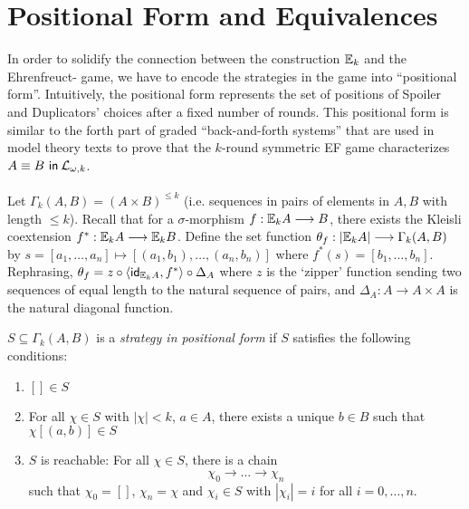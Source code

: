 \section{Positional Form and Equivalences}\label{sec:positionalFormEF}
In order to solidify the connection between the construction ${\mathbb{E}_{k}}$ and the Ehrenfreuct-{\Fraisse} game, we have to encode the strategies in the game into ``positional form''. Intuitively, the positional form represents the set of positions of Spoiler and Duplicators' choices after a fixed number of rounds. This positional form is similar to the forth part of graded ``back-and-forth systems'' that are used in model theory texts to prove that the $k$-round symmetric EF game characterizes ${A \equiv B \ \mathsf{in}\: \mathcal{L}_{\omega,k}}$. \\~\\
Let $\Gamma_{k}(A,B) = (A \times B)^{\leq k}$ (i.e. sequences in pairs of elements in $A,B$ with length $\leq k$). Recall that for a $\sigma$-morphism $f:{\mathbb{E}_{k}A} \longrightarrow B$, there exists the Kleisli coextension $f^{*}:{\mathbb{E}_{k}A} \longrightarrow {\mathbb{E}_{k}B}$. Define the set function $\theta_{f}:|{\mathbb{E}_{k}A}| \longrightarrow \Gamma_{k}(A,B)$ by $s = [a_{1},\dots,a_{n}] \mapsto [(a_{1},b_{1}),\dots,(a_{n},b_{n})]$ where $f^{*}(s) = [b_{1},\dots,b_{n}]$. Rephrasing, $\theta_{f} = z \circ \langle \mathsf{id}_{{\mathbb{E}_{k}A}},f^{*} \rangle \circ \Delta_{A}$ where $z$ is the `zipper' function sending two sequences of equal length to the natural sequence of pairs, and $\Delta_{A}:A \longrightarrow A \times A$ is the natural diagonal function.  
\begin{defn}
$S \subseteq \Gamma_{k}(A,B)$ is a \textit{strategy in positional form} if $S$ satisfies the following conditions:
\begin{enumerate}[label=(S\arabic*),ref=S\arabic*,start=0]
\item $[] \in S$ \label{eq:S1st}
\item For all $\chi \in S$ with $|\chi| < k$, $a \in A$, there exists a unique $b \in B$ such that $\chi[(a,b)] \in S$ \label{eq:S2nd}
\item $S$ is reachable: For all $\chi \in S$, there is a chain \label{eq:S3rd}
$$\chi_{0} \longrightarrow \dots \longrightarrow \chi_{n}$$
such that $\chi_{0} = []$, $\chi_{n} = \chi$ and $\chi_{i} \in S$ with $|\chi_{i}| = i$ for all $i = 0,\dots,n$. 
\end{enumerate}
\end{defn}
